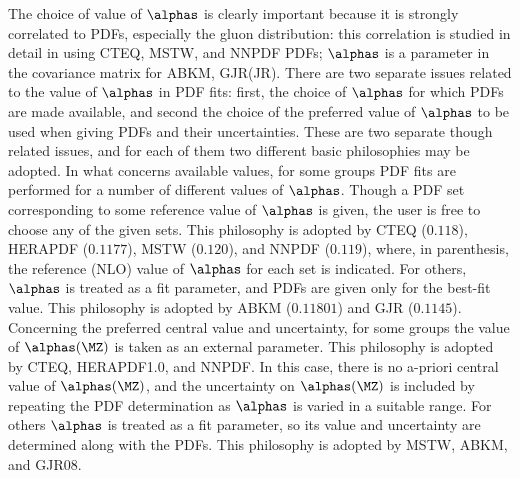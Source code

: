 The choice of value of $\alphas$ is clearly important because it
is strongly correlated to PDFs, especially the gluon distribution: this
correlation is studied in detail in  using
CTEQ, MSTW, and NNPDF PDFs; 
$\alphas$ is a parameter in the covariance matrix for 
ABKM, GJR(JR). 
There are two separate issues related to the value of $\alphas$ in
PDF fits: first, the choice of $\alphas$ for which PDFs are made available, and second the choice of the preferred value of $\alphas$ to be
used when giving PDFs and their uncertainties. 
These are  two separate though related issues, and for each of them
two different basic philosophies 
may be adopted. In what concerns available  values, 
for some groups PDF fits 
are performed for a number of different values of
  $\alphas$. Though a  PDF set corresponding to some
  reference value of $\alphas$ is given, the user is free to
  choose any of the given sets. This philosophy is adopted by CTEQ ($0.118$),
  HERAPDF ($0.1177$), MSTW ($0.120$), and NNPDF ($0.119$), where, in parenthesis, the reference (NLO) value of $\alphas$ for each set is indicated.
  For others, $\alphas$ is treated as a fit parameter, and PDFs
  are given only for the best-fit value. This philosophy is adopted
  by ABKM ($0.11801$) and GJR ($0.1145$).
Concerning the preferred central value and uncertainty, 
for some groups the value of 
$\alphas(\MZ)$ is taken as an external parameter. 
  This philosophy is adopted by CTEQ,
  HERAPDF1.0, and NNPDF. In this case, there is no a-priori central value of $\alphas(\MZ)$, and the uncertainty on
  $\alphas(\MZ)$ is included by repeating the PDF determination as
  $\alphas$ is varied in a suitable range. 
  For others $\alphas$ is treated as a fit parameter, so its value
  and  uncertainty are
  determined along with the PDFs. This  philosophy is adopted by
  MSTW, ABKM, and GJR08.
%
%



